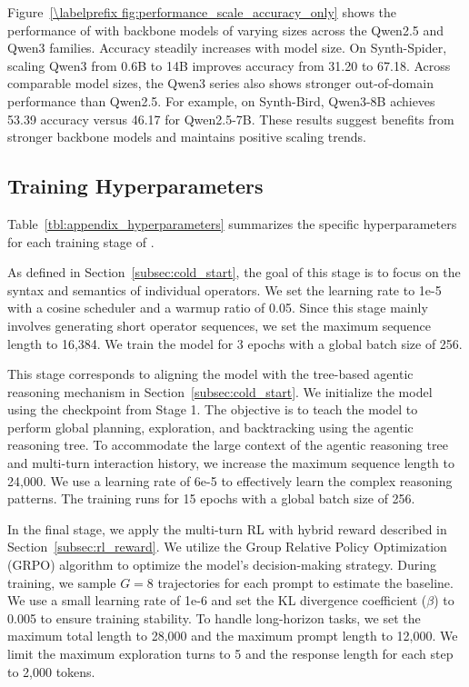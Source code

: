 Figure~\ref{\labelprefix fig:performance_scale_accuracy_only} shows the performance of \sys with backbone models of varying sizes across the Qwen2.5 and Qwen3 families. Accuracy steadily increases with model size. On Synth-Spider, scaling Qwen3 from 0.6B to 14B improves accuracy from 31.20 to 67.18. Across comparable model sizes, the Qwen3 series also shows stronger out-of-domain performance than Qwen2.5. For example, on Synth-Bird, Qwen3-8B achieves 53.39 accuracy versus 46.17 for Qwen2.5-7B. These results suggest \sys benefits from stronger backbone models and maintains positive scaling trends.

\subsection{Training Hyperparameters}
\label{subsec:appendix_training_params}



Table~\ref{tbl:appendix_hyperparameters} summarizes the specific hyperparameters for each training stage of \sys.

As defined in Section~\ref{subsec:cold_start}, the goal of this stage is to focus on the syntax and semantics of individual operators. We set the learning rate to 1e-5 with a cosine scheduler and a warmup ratio of 0.05. Since this stage mainly involves generating short operator sequences, we set the maximum sequence length to 16,384. We train the model for 3 epochs with a global batch size of 256.

This stage corresponds to aligning the model with the tree-based agentic reasoning mechanism in Section~\ref{subsec:cold_start}. We initialize the model using the checkpoint from Stage 1. The objective is to teach the model to perform global planning, exploration, and backtracking using the agentic reasoning tree. To accommodate the large context of the agentic reasoning tree and multi-turn interaction history, we increase the maximum sequence length to 24,000. We use a learning rate of 6e-5 to effectively learn the complex reasoning patterns. The training runs for 15 epochs with a global batch size of 256.

In the final stage, we apply the multi-turn RL with hybrid reward described in Section~\ref{subsec:rl_reward}. We utilize the Group Relative Policy Optimization (GRPO) algorithm to optimize the model's decision-making strategy. During training, we sample $G=8$ trajectories for each prompt to estimate the baseline. We use a small learning rate of 1e-6 and set the KL divergence coefficient ($\beta$) to 0.005 to ensure training stability. To handle long-horizon tasks, we set the maximum total length to 28,000 and the maximum prompt length to 12,000. We limit the maximum exploration turns to 5 and the response length for each step to 2,000 tokens.


